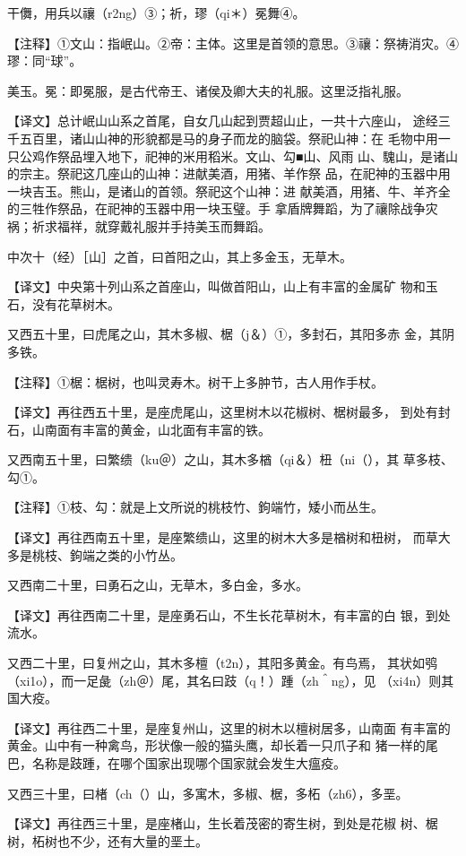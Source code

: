\documentclass[a4paper,12pt,UTF8,twoside]{ctexbook}
\begin{document}
干儛，用兵以禳（r2ng）③；祈，璆（qi＊）冕舞④。

【注释】①文山：指岷山。②帝：主体。这里是首领的意思。③禳：祭祷消灾。④璆：同“球”。

美玉。冕：即冕服，是古代帝王、诸侯及卿大夫的礼服。这里泛指礼服。

【译文】总计岷山山系之首尾，自女几山起到贾超山止，一共十六座山， 途经三千五百里，诸山山神的形貌都是马的身子而龙的脑袋。祭祀山神：在 毛物中用一只公鸡作祭品埋入地下，祀神的米用稻米。文山、勾■山、风雨 山、騩山，是诸山的宗主。祭祀这几座山的山神：进献美酒，用猪、羊作祭 品，在祀神的玉器中用一块吉玉。熊山，是诸山的首领。祭祀这个山神：进 献美酒，用猪、牛、羊齐全的三牲作祭品，在祀神的玉器中用一块玉璧。手 拿盾牌舞蹈，为了禳除战争灾祸；祈求福祥，就穿戴礼服并手持美玉而舞蹈。

中次十（经）［山］之首，曰首阳之山，其上多金玉，无草木。

【译文】中央第十列山系之首座山，叫做首阳山，山上有丰富的金属矿 物和玉石，没有花草树木。

又西五十里，曰虎尾之山，其木多椒、椐（j＆）①，多封石，其阳多赤 金，其阴多铁。

【注释】①椐：椐树，也叫灵寿木。树干上多肿节，古人用作手杖。

【译文】再往西五十里，是座虎尾山，这里树木以花椒树、椐树最多， 到处有封石，山南面有丰富的黄金，山北面有丰富的铁。

又西南五十里，曰繁缋（ku＠）之山，其木多楢（qi＆）杻（ni（），其 草多枝、勾①。

【注释】①枝、勾：就是上文所说的桃枝竹、鉤端竹，矮小而丛生。

【译文】再往西南五十里，是座繁缋山，这里的树木大多是楢树和杻树， 而草大多是桃枝、鉤端之类的小竹丛。

又西南二十里，曰勇石之山，无草木，多白金，多水。

【译文】再往西南二十里，是座勇石山，不生长花草树木，有丰富的白 银，到处流水。

又西二十里，曰复州之山，其木多檀（t2n），其阳多黄金。有鸟焉， 其状如鸮（xi1o），而一足彘（zh＠）尾，其名曰跂（q！）踵（zh＾ng），见 （xi4n）则其国大疫。

【译文】再往西二十里，是座复州山，这里的树木以檀树居多，山南面 有丰富的黄金。山中有一种禽鸟，形状像一般的猫头鹰，却长着一只爪子和 猪一样的尾巴，名称是跂踵，在哪个国家出现哪个国家就会发生大瘟疫。

又西三十里，曰楮（ch（）山，多寓木，多椒、椐，多柘（zh6），多垩。

【译文】再往西三十里，是座楮山，生长着茂密的寄生树，到处是花椒 树、椐树，柘树也不少，还有大量的垩土。
\end{document}
